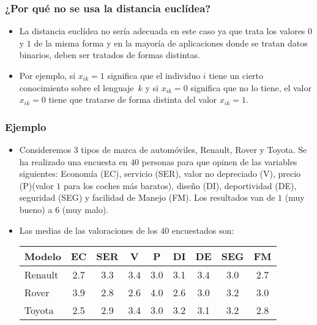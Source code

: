 \begin{frame}
\frametitle{¿Por qué no se usa la distancia euclídea?}
\begin{itemize}
\item<2->{La distancia euclídea no sería adecuada en este caso ya que trata los valores $0$ y $1$ de la misma forma y en la mayoría de aplicaciones donde se tratan datos binarios, deben ser tratados de formas distintas.}
\item<3->{Por ejemplo, si $x_{ik}=1$ significa que el individuo $i$ tiene un cierto conocimiento sobre el lenguaje~$k$ y si $x_{ik}=0$ significa que no lo tiene, el valor $x_{ik}=0$ tiene que tratarse de forma distinta del valor $x_{ik}=1$.}
\end{itemize}
\end{frame}
\begin{frame}
\frametitle{Ejemplo}
\begin{itemize}
\item<2->{Consideremos $3$ tipos de marca de automóviles, Renault, Rover y Toyota. Se ha realizado una encuesta en $40$ personas para que opinen de las variables siguientes: Economía (EC), servicio (SER), valor no depreciado (V), precio (P)(valor $1$ para los coches más baratos), diseño (DI), deportividad (DE), seguridad (SEG) y facilidad de Manejo (FM). Los resultados van de $1$ (muy bueno) a $6$ (muy malo).}
\item<3->{Las medias de las valoraciones de los $40$ encuestados son:
\vskip 0.25cm
\begin{tabular}{|l|c|c|c|c|c|c|c|c|}
\hline
Modelo&EC&SER&V&P&DI&DE&SEG&FM\\\hline
Renault&2.7&3.3&3.4&3.0&3.1&3.4&3.0&2.7\\\hline
Rover&3.9&2.8&2.6&4.0&2.6&3.0&3.2&3.0\\\hline
Toyota&2.5&2.9&3.4&3.0&3.2&3.1&3.2&2.8\\\hline
\end{tabular}
}
\end{itemize}
\end{frame}
